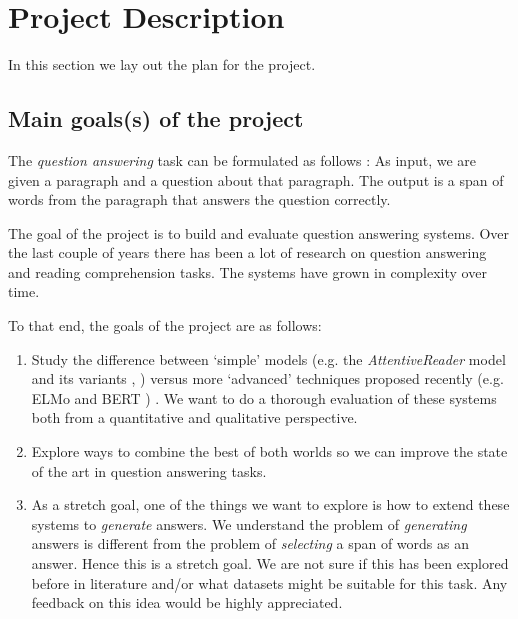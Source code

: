 \section{Project Description}
\label{sec:projectdescription}

In this section we lay out the plan for the project.

\subsection{Main goals(s) of the project}
\label{subsec:projectgoals}

The \textit{question answering} task can be formulated as follows : As input, we are given a paragraph and a question about that paragraph. The output is a span of words from the paragraph that answers the question correctly.

The goal of the project is to build and evaluate question answering systems.  Over the last couple of years there has been a lot of research on question answering and reading comprehension tasks. The systems have grown in complexity over time.

To that end, the goals of the project are as follows:

\begin{enumerate}

\item Study the difference between `simple' models (e.g. the \textit{AttentiveReader} model \cite{hermann2015teaching} and its variants  \cite{chen2016thorough}, \cite{chen2017reading}) versus more `advanced' techniques proposed recently (e.g. ELMo \cite{peters2018deep} and BERT \cite{devlin2018bert}) . We want to do a thorough evaluation of these systems both from a quantitative and qualitative perspective.

\item Explore ways to combine the best of both worlds so we can improve the state of the art in question answering tasks.

\item As a stretch goal, one of the things we want to explore is how to extend these systems to \textit{generate} answers. We understand the problem of \textit{generating} answers is different from the problem of \textit{selecting} a span of words as an answer. Hence this is a stretch goal. We are not sure if this has been explored before in literature and/or what datasets might be suitable for this task. Any feedback on this idea would be highly appreciated.


\end{enumerate}

